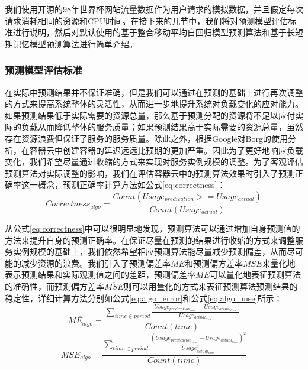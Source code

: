 我们使用开源的98年世界杯网站流量数据\cite{arlitt2000workload}作为用户请求的模拟数据，并且假定每次请求消耗相同的资源和CPU时间。在接下来的几节中，我们将对预测模型评估标准进行说明，然后对默认使用的基于整合移动平均自回归模型预测算法和基于长短期记忆模型预测算法进行简单介绍。

\subsubsection{预测模型评估标准}
在实际中预测结果并不保证准确，但是我们可以通过在预测的基础上进行再次调整的方式来提高系统整体的灵活性，从而进一步地提升系统对负载变化的应对能力。如果预测结果低于实际需要的资源总量，那么基于预测分配的资源将不足以应付实际的负载从而降低整体的服务质量；如果预测结果高于实际需要的资源总量，虽然存在资源浪费但保证了服务的服务质量。除此之外，根据Google对Borg的使用分析，在容器云中创建容器的延迟远远比预期的更加严重\cite{verma2015large}。因此为了更好地响应负载变化，我们希望尽量通过收缩的方式来实现对服务实例规模的调整。为了客观评估预测算法对实际调整的影响，我们在评估容器云中的预测算法效果时引入了预测正确率这一概念，预测正确率计算方法如公式\ref{eq:correctness}：
\begin{equation}\label{eq:correctness}
Correctness_{algo} = \frac{Count(Usage_{predication} >= Usage_{actual})}{Count(Usage_{actual})}
\end{equation}

从公式\ref{eq:correctness}中可以很明显地发现，预测算法可以通过增加自身预测值的方法来提升自身的预测正确率。在保证尽量在预测的结果进行收缩的方式来调整服务实例规模的基础上，我们依然希望相应预测算法能尽量减少预测偏差，从而尽可能的减少资源的浪费。我们引入了预测偏差率$\overline{ME}$和预测偏方差率$\overline{MSE}$来量化地表示预测结果和实际观测值之间的差距，预测偏差率$\overline{ME}$可以量化地表征预测算法的准确性，而预测偏方差率$\overline{MSE}$则可以用量化的方式来表征预测算法预测结果的稳定性，详细计算方法分别如公式\ref{eq:algo_error}和公式\ref{eq:algo_mse}所示：
\begin{equation}\label{eq:algo_error}
\overline{ME_{algo}} = \frac{\sum_{time \in period} {\frac{\vert Usage_{predication_{time}} - Usage_{actual_{time}}\vert}{Usage_{actual_{time}}}}}{Count(time)}
\end{equation}
\begin{equation}\label{eq:algo_mse}
\overline{MSE_{algo}} = \frac{\sum_{time \in period} {\frac{(Usage_{predication_{time}} - Usage_{actual_{time}})^{2}}{Usage_{actual_{time}}^{2}}}}{Count(time)}
\end{equation}

